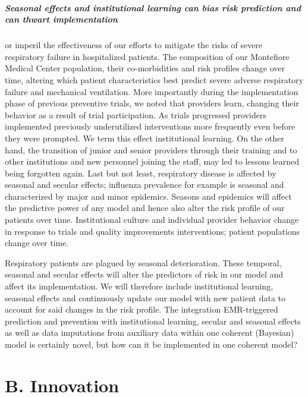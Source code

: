 \documentclass[11pt,notitlepage]{article}
\begin{document}
\subparagraph*{Seasonal effects and institutional learning can bias risk prediction and can thwart implementation} or imperil the effectiveness of our efforts to mitigate the risks of severe respiratory failure in hospitalized patients. The composition of our Montefiore Medical Center population, their co-morbidities and risk profiles change over time, altering which patient characteristics best predict severe adverse respiratory failure and mechanical ventilation. More importantly  during the implementation phase of previous preventive trials, we noted that providers learn, changing their behavior as a result of trial participation. As trials progressed providers implemented previously underutilized interventions more frequently even before they were prompted. We term this effect institutional learning. On the other hand, the transition of junior and senior providers through their training and to other institutions and new personnel joining the staff, may led to lessons learned being forgotten again. Last but not least, respiratory disease is affected by seasonal and secular effects; influenza prevalence for example is seasonal and characterized by major and minor epidemics. Seasons and epidemics will affect the predictive power of any model and hence also alter the risk profile of our patients over time. Institutional culture and individual provider behavior change in response to trials and quality improvements interventions; patient populations change over time. 

Respiratory patients are plagued by seasonal deterioration. These temporal, seasonal and secular effects will alter the predictors of risk in our model and affect its implementation. We will therefore include institutional learning, seasonal effects and continuously update our model with new patient data to account for said changes in the risk profile. The integration EMR-triggered prediction and prevention with  institutional learning, secular and seasonal effects as well as data imputations from auxiliary data within one coherent (Bayesian) model is certainly novel, but how can it be implemented in one coherent model? 

\section*{B. Innovation}
\end{document}
